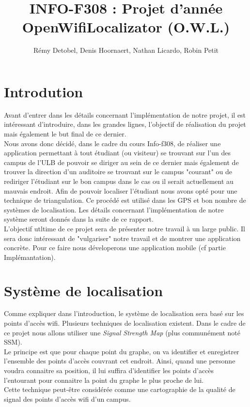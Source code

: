 \documentclass[a4paper,11pt]{article}
\title{INFO-F308 : Projet d'année \\ OpenWifiLocalizator (O.W.L.)}
\author{Rémy Detobel, Denis Hoornaert, Nathan Licardo, Robin Petit}
\begin{document}
\maketitle

\section{Introdution}
  Avant d'entrer dans les détails concernant l'implémentation de notre projet, il est intéressant d'introduire, dans les grandes lignes, l'objectif de réalisation du projet mais également le but final de ce dernier.\\
Nous avons donc décidé, dans le cadre du cours Info-f308, de réaliser une application permettant à tout étudiant (ou visiteur) se trouvant sur l'un des campus de l'ULB de pouvoir se diriger au sein de ce dernier mais également de trouver la direction d'un auditoire se trouvant sur le campus "courant" ou de rediriger l'étudiant sur le bon campus dans le cas ou il serait actuellement au mauvais endroit. Afin de pouvoir localiser l'étudiant nous avons opté pour une technique de triangulation. Ce procédé est utilisé dans les GPS et bon nombre de systèmes de localisation. Les détails concernant l'implémentation de notre système seront donnés dans la suite de ce rapport.\\
L'objectif utltime de ce projet sera de présenter notre travail à un large public. Il sera donc intéressant de "vulgariser" notre travail et de montrer une application concrète. Pour ce faire nous déveloperons une application mobile (cf partie Implémantation).

\section{Système de localisation}
  Comme expliquer dans l'introduction, le système de localisation sera basé sur les points d'accès wifi. Plusieurs techniques de localisation existent. Dans le cadre de ce projet nous allons utiliser une \textit{Signal Strength Map} (plus communément noté SSM).\\
  Le principe est que pour chaque point du graphe, on va identifier et enregistrer l'ensemble des points d'accès couvrant cet endroit. Ainsi, quand une personne voudra connaitre sa position, il lui suffira d'identifier les points d'accès l'entourant pour connaitre la point du graphe le plus proche de lui.\\
  Cette technique peut-être considérée comme une cartographie de la qualité de signal des points d'accès wifi d'un campus.
    
\end{document}
